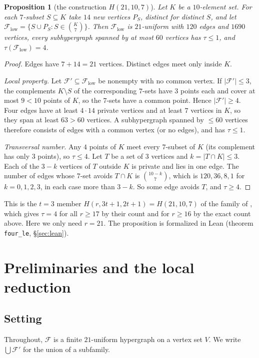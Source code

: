 \documentclass[11pt]{amsart}
\newtheorem{proposition}[theorem]{Proposition}
\theoremstyle{definition}
\newcommand{\cF}{\mathcal{F}}
\begin{document}
\begin{proposition}[the construction $H(21,10,7)$]\label{prop:lower}
Let $K$ be a $10$-element set. For each $7$-subset $S\subseteq K$ take $14$ new vertices $P_S$, distinct for distinct $S$, and let $\cF_{\mathrm{low}}=\{S\cup P_S: S\in\binom{K}{7}\}$. Then $\cF_{\mathrm{low}}$ is $21$-uniform with $120$ edges and $1690$ vertices, every subhypergraph spanned by at most $60$ vertices has $\tau\le 1$, and $\tau(\cF_{\mathrm{low}})=4$.
\end{proposition}

\begin{proof}
Edges have $7+14=21$ vertices. Distinct edges meet only inside $K$.

\emph{Local property.} Let $\cF'\subseteq\cF_{\mathrm{low}}$ be nonempty with no common vertex. If $|\cF'|\le 3$, the complements $K\setminus S$ of the corresponding $7$-sets have $3$ points each and cover at most $9<10$ points of $K$, so the $7$-sets have a common point. Hence $|\cF'|\ge 4$. Four edges have at least $4\cdot 14$ private vertices and at least $7$ vertices in $K$, so they span at least $63>60$ vertices. A subhypergraph spanned by $\le 60$ vertices therefore consists of edges with a common vertex (or no edges), and has $\tau\le 1$.

\emph{Transversal number.} Any $4$ points of $K$ meet every $7$-subset of $K$ (its complement has only $3$ points), so $\tau\le 4$. Let $T$ be a set of $3$ vertices and $k=|T\cap K|\le 3$. Each of the $3-k$ vertices of $T$ outside $K$ is private and lies in one edge. The number of edges whose $7$-set avoids $T\cap K$ is $\binom{10-k}{7}$, which is $120,36,8,1$ for $k=0,1,2,3$, in each case more than $3-k$. So some edge avoids $T$, and $\tau\ge 4$.
\end{proof}

This is the $t=3$ member $H(r,3t+1,2t+1)=H(21,10,7)$ of the family of \cite{EHT91}, which gives $\tau=4$ for all $r\ge17$ by their count and for $r\ge16$ by the exact count above. Here we only need $r=21$. The proposition is formalized in Lean (theorem \texttt{four\_le}, \S\ref{sec:lean}).

\section{Preliminaries and the local reduction}\label{sec:prelim}

\subsection{Setting}
Throughout, $\cF$ is a finite $21$-uniform hypergraph on a vertex set $V$. We write $\bigcup\cF'$ for the union of a subfamily.
\end{document}

